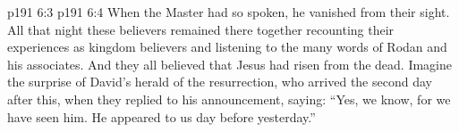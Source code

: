\vs p191 6:3 
\vs p191 6:4 When the Master had so spoken, he vanished from their sight. All that night these believers remained there together recounting their experiences as kingdom believers and listening to the many words of Rodan and his associates. And they all believed that Jesus had risen from the dead. Imagine the surprise of David’s herald of the resurrection, who arrived the second day after this, when they replied to his announcement, saying: “Yes, we know, for we have seen him. He appeared to us day before yesterday.”
